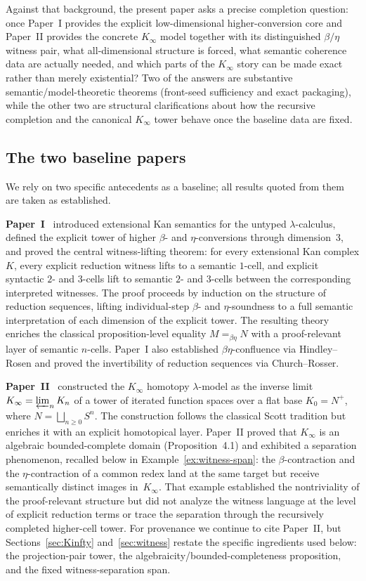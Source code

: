 \documentclass[webpdf,traditional,large,numbered]{oup-authoring-template}
\theoremstyle{thmstyleone}%
\theoremstyle{thmstyletwo}%
\theoremstyle{thmstylethree}%
\newcommand{\Kinf}{K_\infty}
\begin{document}
Against that background, the present paper asks a precise completion question:
once Paper~I provides the explicit low-dimensional higher-conversion core and
Paper~II provides the concrete $\Kinf$ model together with its distinguished
$\beta/\eta$ witness pair, what all-dimensional structure is forced, what
semantic coherence data are actually needed, and which parts of the
$\Kinf$ story can be made exact rather than merely existential?  Two of the
answers are substantive semantic/model-theoretic theorems (front-seed
sufficiency and exact packaging), while the other two are structural
clarifications about how the recursive completion and the canonical
$\Kinf$ tower behave once the baseline data are fixed.

\subsection{The two baseline papers}

We rely on two specific antecedents as a baseline; all results quoted
from them are taken as established.

\medskip
\noindent\textbf{Paper~I}~\cite{MRdQ:theory} introduced extensional Kan
semantics for the untyped $\lambda$-calculus, defined the explicit tower of
higher $\beta$- and $\eta$-conversions through dimension~3, and proved the
central witness-lifting theorem: for every extensional Kan complex $K$, every
explicit reduction witness lifts to a semantic $1$-cell, and explicit
syntactic $2$- and $3$-cells lift to semantic $2$- and $3$-cells between the
corresponding interpreted witnesses.
The proof proceeds by induction on the structure of reduction sequences,
lifting individual-step $\beta$- and $\eta$-soundness to a full semantic
interpretation of each dimension of the explicit tower.  The resulting theory
enriches the classical proposition-level equality $M=_{\beta\eta}N$ with a
proof-relevant layer of semantic $n$-cells.  Paper~I also established
$\beta\eta$-confluence via Hindley--Rosen and proved the invertibility of
reduction sequences via Church--Rosser.

\medskip
\noindent\textbf{Paper~II}~\cite{MRdQ:Kinfinity} constructed the $\Kinf$
homotopy $\lambda$-model as the inverse limit
$\Kinf=\varprojlim_n K_n$ of a tower of iterated function spaces over a
flat base $K_0=N^+$, where $N=\bigsqcup_{n\ge 0} S^n$.
The construction follows the classical Scott tradition but enriches it with an
explicit homotopical layer.  Paper~II proved that $\Kinf$ is an algebraic
bounded-complete domain (Proposition~4.1) and exhibited a separation
phenomenon, recalled below in Example~\ref{ex:witness-span}: the
$\beta$-contraction and the $\eta$-contraction
of a common redex land at the same target but receive semantically distinct
images in~$\Kinf$.  That example established the nontriviality of the
proof-relevant structure but did not analyze the witness language at the level
of explicit reduction terms or trace the separation through the recursively
completed higher-cell tower.
For provenance we continue to cite Paper~II, but Sections~\ref{sec:Kinfty}
and~\ref{sec:witness} restate the specific ingredients used below: the
projection-pair tower, the algebraicity/bounded-completeness proposition, and
the fixed witness-separation span.
\end{document}
